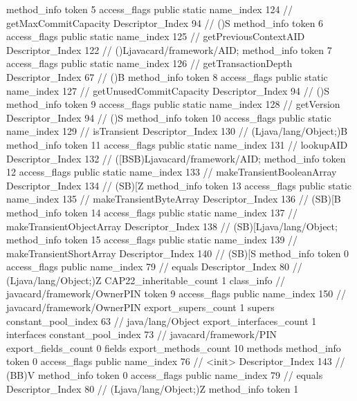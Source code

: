 {{{{{				}
				method_info {
					token	5
					access_flags	public static
					name_index	124		// getMaxCommitCapacity
					Descriptor_Index	94		// ()S
				}
				method_info {
					token	6
					access_flags	public static
					name_index	125		// getPreviousContextAID
					Descriptor_Index	122		// ()Ljavacard/framework/AID;
				}
				method_info {
					token	7
					access_flags	public static
					name_index	126		// getTransactionDepth
					Descriptor_Index	67		// ()B
				}
				method_info {
					token	8
					access_flags	public static
					name_index	127		// getUnusedCommitCapacity
					Descriptor_Index	94		// ()S
				}
				method_info {
					token	9
					access_flags	public static
					name_index	128		// getVersion
					Descriptor_Index	94		// ()S
				}
				method_info {
					token	10
					access_flags	public static
					name_index	129		// isTransient
					Descriptor_Index	130		// (Ljava/lang/Object;)B
				}
				method_info {
					token	11
					access_flags	public static
					name_index	131		// lookupAID
					Descriptor_Index	132		// ([BSB)Ljavacard/framework/AID;
				}
				method_info {
					token	12
					access_flags	public static
					name_index	133		// makeTransientBooleanArray
					Descriptor_Index	134		// (SB)[Z
				}
				method_info {
					token	13
					access_flags	public static
					name_index	135		// makeTransientByteArray
					Descriptor_Index	136		// (SB)[B
				}
				method_info {
					token	14
					access_flags	public static
					name_index	137		// makeTransientObjectArray
					Descriptor_Index	138		// (SB)[Ljava/lang/Object;
				}
				method_info {
					token	15
					access_flags	public static
					name_index	139		// makeTransientShortArray
					Descriptor_Index	140		// (SB)[S
				}
				method_info {
					token	0
					access_flags	public
					name_index	79		// equals
					Descriptor_Index	80		// (Ljava/lang/Object;)Z
				}
			}
			CAP22_inheritable_count	1
		}
		class_info {		// javacard/framework/OwnerPIN
			token	9
			access_flags	public
			name_index	150		// javacard/framework/OwnerPIN
			export_supers_count	1
			supers {
				constant_pool_index	63		// java/lang/Object
			}
			export_interfaces_count	1
			interfaces {
				constant_pool_index	73		// javacard/framework/PIN
			}
			export_fields_count	0
			fields {
			}
			export_methods_count	10
			methods {
				method_info {
					token	0
					access_flags	public
					name_index	76		// <init>
					Descriptor_Index	143		// (BB)V
				}
				method_info {
					token	0
					access_flags	public
					name_index	79		// equals
					Descriptor_Index	80		// (Ljava/lang/Object;)Z
				}
				method_info {
					token	1
}}}}}
